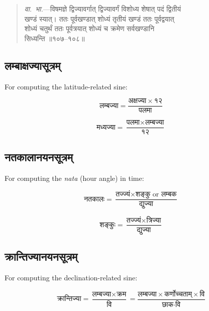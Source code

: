 \documentclass[11pt,a4paper]{article}
\newcommand{\dev}[1]{{\devanagarifont #1}}
\newenvironment{vyakhya}{%
  \begin{quote}
  \small
  \setlength{\leftmargin}{1em}
  \devanagarifont
}{\end{quote}}
\newcommand{\skt}[1]{{\devanagarifont #1}}
\begin{document}
\begin{vyakhya}
\textit{वा.~भा.}—\skt{विषमज्ञे द्विज्यावर्गात् द्विज्यावर्गं विशोध्य शेषात् पदं द्वितीयं}\\
\skt{खण्डं स्यात्। ततः पूर्वखण्डात् शोध्यं तृतीयं खण्डं ततः पूर्वद्वयात्}\\
\skt{शोध्यं चतुर्थं ततः पूर्वत्रयात् शोध्यं च क्रमेण सर्वखण्डानि}\\
\skt{सिध्यन्ति ॥१०७--१०८॥}
\end{vyakhya}

\subsection{\dev{लम्बाक्षज्यासूत्रम्}}

For computing the latitude-related sine:

\begin{equation}
\text{लम्बज्या} = \frac{\text{अक्षज्या} \times १२}{\text{पलमा}}
\end{equation}

\begin{equation}
\text{मध्यज्या} = \frac{\text{पलमा} \times \text{लम्बज्या}}{१२}
\end{equation}

\subsection{\dev{नतकालानयनसूत्रम्}}

For computing the \textit{nata} (hour angle) in time:

\begin{equation}
\text{नतकालः} = \frac{\text{तज्ज्यं} \times \text{शङ्कु or लम्बक}}{\text{द्युज्या}}
\end{equation}

\begin{equation}
\text{शङ्कुः} = \frac{\text{तज्ज्यं} \times \text{त्रिज्या}}{\text{द्युज्या}}
\end{equation}

\subsection{\dev{क्रान्तिज्यानयनसूत्रम्}}

For computing the declination-related sine:

\begin{equation}
\text{क्रान्तिज्या} = \frac{\text{लम्बज्या} \times \text{क्रम}}{\text{वि}} = \frac{\text{लम्बज्या} \times \text{कर्णोच्चताम्} \times \text{वि}}{\text{छाक} \cdot \text{वि}}
\end{equation}
\end{document}
